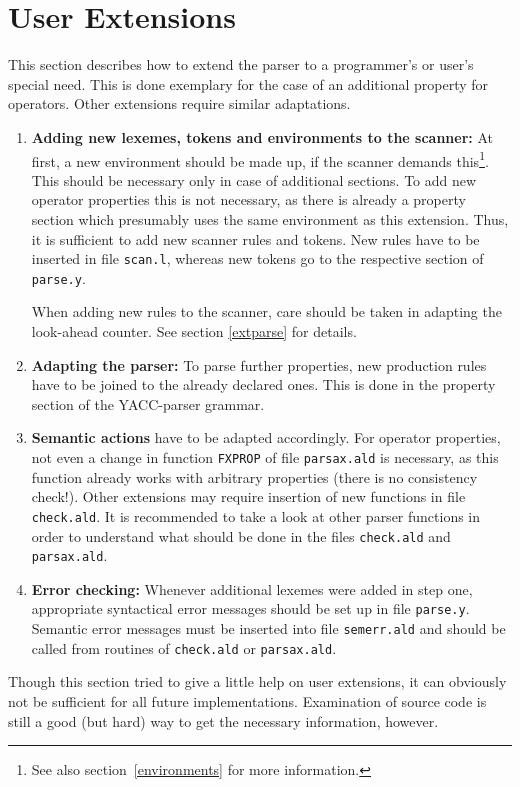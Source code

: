 \section{User Extensions}

This section describes how to extend the parser to a programmer's
or user's special need. This is done exemplary for the case of an
additional property for operators. 
Other extensions require similar adaptations.

\begin{enumerate}
\item{\bf Adding new lexemes, tokens and environments to the scanner:}
 At first, a new environment should be made up, if the scanner demands
 this\footnote{See also section~\ref{environments} for more information.}.
 This should be necessary only in case of additional sections.
 To add new operator properties this is not necessary, as there is already
 a property section which presumably uses the same environment as this
 extension. Thus, it is sufficient to add new scanner rules and tokens.
 New rules have to be inserted in file {\tt scan.l}, whereas new tokens
 go to the respective section of {\tt parse.y}.

 When adding new rules to the scanner, care should be taken in
 adapting the look-ahead counter. See section \ref{extparse} for details.
\item{\bf Adapting the parser:} To parse further properties, new production
 rules have to be joined to the already declared ones. This is done
 in the property section of the YACC-parser grammar.
\item{\bf Semantic actions} have to be adapted accordingly. For operator
 properties, not even a change in function {\tt FXPROP} of file
 {\tt parsax.ald} is necessary, as this function already works with arbitrary
 properties (there is no consistency check!). Other extensions may
 require insertion of new functions in file {\tt check.ald}. It is recommended
 to take a look at other parser functions in order to understand
 what should be done in the files {\tt check.ald} and {\tt parsax.ald}.
\item{\bf Error checking:} Whenever additional lexemes were added in
 step one, appropriate syntactical error messages should be set up
 in file {\tt parse.y}. Semantic error messages must be inserted
 into file {\tt semerr.ald} and should be called from routines
 of {\tt check.ald} or {\tt parsax.ald}.
\end{enumerate}

Though this section tried to give a little help on user extensions,
it can obviously not be sufficient for all future implementations.
Examination of source code is still a good (but hard) way to get the
necessary information, however.
